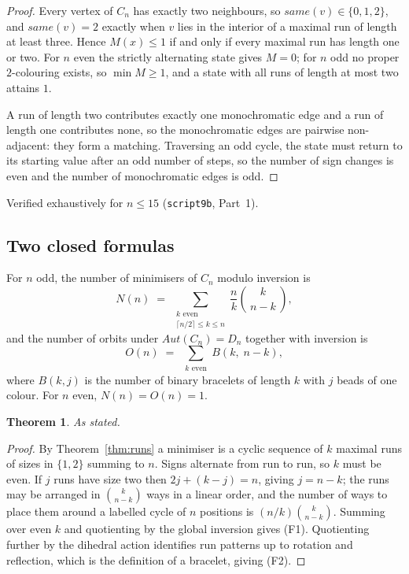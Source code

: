 \documentclass[11pt,a4paper]{article}
\def\mathrm#1{#1}%
\newtheorem{theorem}{Theorem}[section]
\newcommand{\same}{\mathrm{same}}
\newcommand{\Aut}{\mathrm{Aut}}
\begin{document}
\begin{proof}
Every vertex of $C_n$ has exactly two neighbours, so $\same(v)\in\{0,1,2\}$, and $\same(v)=2$ exactly when $v$ lies in the interior of a maximal run of length at least three. Hence $M(x)\le1$ if and only if every maximal run has length one or two. For $n$ even the strictly alternating state gives $M=0$; for $n$ odd no proper $2$-colouring exists, so $\min M\ge1$, and a state with all runs of length at most two attains $1$.

A run of length two contributes exactly one monochromatic edge and a run of length one contributes none, so the monochromatic edges are pairwise non-adjacent: they form a matching. Traversing an odd cycle, the state must return to its starting value after an odd number of steps, so the number of sign changes is even and the number of monochromatic edges is odd.
\end{proof}

Verified exhaustively for $n\le15$ (\texttt{script9b}, Part~1).

\subsection{Two closed formulas}

\begin{theorembox}
For $n$ odd, the number of minimisers of $C_n$ modulo inversion is
\[
N(n)\;=\;\sum_{\substack{k \text{ even}\\ \lceil n/2\rceil\le k\le n}}\frac{n}{k}\binom{k}{\,n-k\,},
\tag{F1}
\]
and the number of orbits under $\Aut(C_n)=D_n$ together with inversion is
\[
O(n)\;=\;\sum_{\substack{k \text{ even}}} B\!\left(k,\;n-k\right),
\tag{F2}
\]
where $B(k,j)$ is the number of binary bracelets of length $k$ with $j$ beads of one colour. For $n$ even, $N(n)=O(n)=1$.
\end{theorembox}

\begin{theorem}
\label{thm:formulas}
As stated.
\end{theorem}

\begin{proof}
By Theorem~\ref{thm:runs} a minimiser is a cyclic sequence of $k$ maximal runs of sizes in $\{1,2\}$ summing to $n$. Signs alternate from run to run, so $k$ must be even. If $j$ runs have size two then $2j+(k-j)=n$, giving $j=n-k$; the runs may be arranged in $\binom{k}{n-k}$ ways in a linear order, and the number of ways to place them around a labelled cycle of $n$ positions is $(n/k)\binom{k}{n-k}$. Summing over even $k$ and quotienting by the global inversion gives (F1). Quotienting further by the dihedral action identifies run patterns up to rotation and reflection, which is the definition of a bracelet, giving (F2).
\end{proof}
\end{document}
